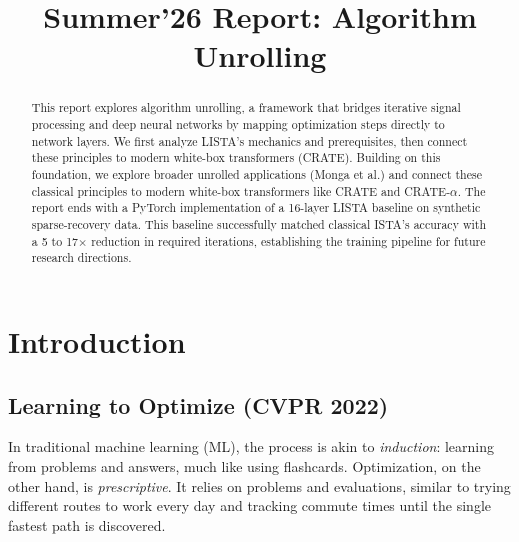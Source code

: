 \documentclass[conference]{IEEEtran}
\begin{document}
\title{Summer'26 Report: Algorithm Unrolling}

\author{
}

\maketitle

\begin{abstract}
This report explores algorithm unrolling, a framework that bridges iterative signal processing and deep neural networks by mapping optimization steps directly to network layers. We first analyze LISTA's mechanics and prerequisites, then connect these principles to modern white-box transformers (CRATE). Building on this foundation, we explore broader unrolled applications (Monga et al.) and connect these classical principles to modern white-box transformers like CRATE and CRATE-$\alpha$. The report ends with a PyTorch implementation of a 16-layer LISTA baseline on synthetic sparse-recovery data. This baseline successfully matched classical ISTA's accuracy with a 5 to 17$\times$ reduction in required iterations, establishing the training pipeline for future research directions.
\end{abstract}

\section{Introduction}

\subsection{Learning to Optimize (CVPR 2022) \texorpdfstring{\cite{chen2021learning}}{}}

In traditional machine learning (ML), the process is akin to \textit{induction}: learning from problems and answers, much like using flashcards. Optimization, on the other hand, is \textit{prescriptive}. It relies on problems and evaluations, similar to trying different routes to work every day and tracking commute times until the single fastest path is discovered. 
\end{document}
